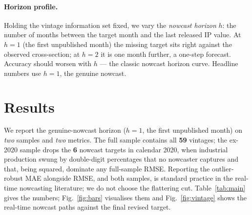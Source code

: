 \documentclass[11pt]{article}
\begin{document}
\paragraph{Horizon profile.} Holding the vintage information set fixed, we vary the
\emph{nowcast horizon} $h$: the number of months between the target month and the last
released IP value. At $h{=}1$ (the first unpublished month) the missing target sits right
against the observed cross-section; at $h{=}2$ it is one month further, a one-step
forecast. Accuracy should worsen with $h$ --- the classic nowcast horizon curve. Headline
numbers use $h{=}1$, the genuine nowcast.

\section{Results}
We report the genuine-nowcast horizon ($h{=}1$, the first unpublished month) on
\emph{two} samples and \emph{two} metrics. The full sample contains all \textbf{59}
vintages; the ex-2020 sample drops the \textbf{6} nowcast targets in calendar
2020, when industrial production swung by double-digit percentages that no nowcaster
captures and that, being squared, dominate any full-sample RMSE. Reporting the
outlier-robust MAE alongside RMSE, and both samples, is standard practice in the real-time
nowcasting literature; we do not choose the flattering cut.
Table~\ref{tab:main} gives the numbers; Fig.~\ref{fig:bars} visualises them and
Fig.~\ref{fig:vintage} shows the real-time nowcast paths against the final revised target.
\end{document}
